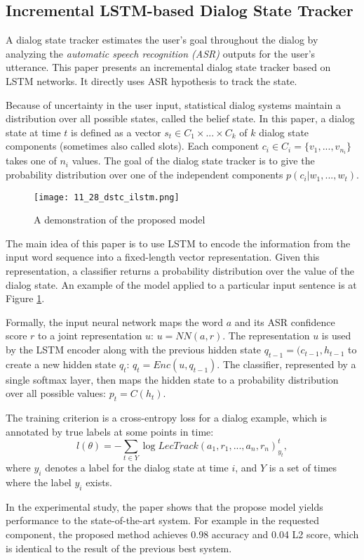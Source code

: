 \subsection{Incremental LSTM-based Dialog State Tracker \cite{Zilka2015}}

A dialog state tracker estimates the user's goal throughout the dialog by analyzing the \emph{automatic speech recognition (ASR)} outputs for the user's utterance. This paper presents an incremental dialog state tracker based on LSTM networks. It directly uses ASR hypothesis to track the state.

Because of uncertainty in the user input, statistical dialog systems maintain a distribution over all possible states, called the belief state. In this paper, a dialog state at time $t$ is defined as a vector $s_t \in C_1 \times ... \times C_k$ of $k$ dialog state components (sometimes also called slots). Each component $c_i \in C_i = \{ v_1, ..., v_{n_i} \}$ takes one of $n_i$ values. The goal of the dialog state tracker is to give the probability distribution over one of the independent components $p(c_i | w_1, ..., w_t)$.

\begin{figure}[h]
  \centering
  \texttt{[image: 11\_28\_dstc\_ilstm.png]}\\
  \caption{A demonstration of the proposed model}\label{fig:dstc_ilstm}
\end{figure}

The main idea of this paper is to use LSTM to encode the information from the input word sequence into a fixed-length vector representation. Given this representation, a classifier returns a probability distribution over the value of the dialog state. An example of the model applied to a particular input sentence is at Figure \ref{fig:dstc_ilstm}.

Formally, the input neural network maps the word $a$ and its ASR confidence score $r$ to a joint representation $u$: $u = NN(a, r)$. The representation $u$ is used by the LSTM encoder along with the previous hidden state $q_{t-1} = (c_{t-1}, h_{t-1}$ to create a new hidden state $q_t$: $q_t = Enc(u, q_{t-1})$. The classifier, represented by a single softmax layer, then maps the hidden state to a probability distribution over all possible values: $p_t = C(h_t)$.

The training criterion is a cross-entropy loss for a dialog example, which is annotated by true labels at some points in time:
$$l(\theta) = - \sum_{t \in Y} \log LecTrack(a_1, r_1, ..., a_n, r_n)_{y_t}^t,$$
where $y_i$ denotes a label for the dialog state at time $i$, and $Y$ is a set of times where the label $y_i$ exists.

In the experimental study, the paper shows that the propose model yields performance to the state-of-the-art system. For example in the requested component, the proposed method achieves 0.98 accuracy and 0.04 L2 score, which is identical to the result of the previous best system. 